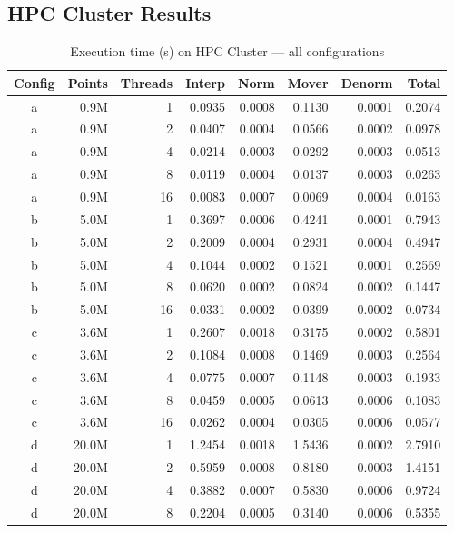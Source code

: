 \documentclass[12pt,a4paper]{article}
\begin{document}
\subsection{HPC Cluster Results}

\begin{table}[H]
\centering
\caption{Execution time (s) on HPC Cluster --- all configurations}
\label{tab:cluster_all}
\begin{tabular}{crrrrrrr}
\toprule
\textbf{Config} & \textbf{Points} & \textbf{Threads} & \textbf{Interp} & \textbf{Norm} & \textbf{Mover} & \textbf{Denorm} & \textbf{Total} \\
\midrule
a & 0.9M  & 1  & 0.0935 & 0.0008 & 0.1130 & 0.0001 & 0.2074 \\
a & 0.9M  & 2  & 0.0407 & 0.0004 & 0.0566 & 0.0002 & 0.0978 \\
a & 0.9M  & 4  & 0.0214 & 0.0003 & 0.0292 & 0.0003 & 0.0513 \\
a & 0.9M  & 8  & 0.0119 & 0.0004 & 0.0137 & 0.0003 & 0.0263 \\
a & 0.9M  & 16 & 0.0083 & 0.0007 & 0.0069 & 0.0004 & 0.0163 \\
\midrule
b & 5.0M  & 1  & 0.3697 & 0.0006 & 0.4241 & 0.0001 & 0.7943 \\
b & 5.0M  & 2  & 0.2009 & 0.0004 & 0.2931 & 0.0004 & 0.4947 \\
b & 5.0M  & 4  & 0.1044 & 0.0002 & 0.1521 & 0.0001 & 0.2569 \\
b & 5.0M  & 8  & 0.0620 & 0.0002 & 0.0824 & 0.0002 & 0.1447 \\
b & 5.0M  & 16 & 0.0331 & 0.0002 & 0.0399 & 0.0002 & 0.0734 \\
\midrule
c & 3.6M  & 1  & 0.2607 & 0.0018 & 0.3175 & 0.0002 & 0.5801 \\
c & 3.6M  & 2  & 0.1084 & 0.0008 & 0.1469 & 0.0003 & 0.2564 \\
c & 3.6M  & 4  & 0.0775 & 0.0007 & 0.1148 & 0.0003 & 0.1933 \\
c & 3.6M  & 8  & 0.0459 & 0.0005 & 0.0613 & 0.0006 & 0.1083 \\
c & 3.6M  & 16 & 0.0262 & 0.0004 & 0.0305 & 0.0006 & 0.0577 \\
\midrule
d & 20.0M & 1  & 1.2454 & 0.0018 & 1.5436 & 0.0002 & 2.7910 \\
d & 20.0M & 2  & 0.5959 & 0.0008 & 0.8180 & 0.0003 & 1.4151 \\
d & 20.0M & 4  & 0.3882 & 0.0007 & 0.5830 & 0.0006 & 0.9724 \\
d & 20.0M & 8  & 0.2204 & 0.0005 & 0.3140 & 0.0006 & 0.5355 \\

\end{tabular}
\end{table}
\end{document}
